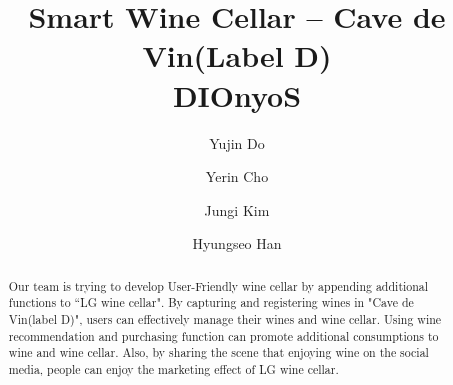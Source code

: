 \documentclass[sigconf, nonacm]{acmart}
\begin{document}
\title{Smart Wine Cellar – Cave de Vin(Label D)\\DIOnyoS}

\author{Yujin Do}

\author{Yerin Cho}

\author{Jungi Kim}

\author{Hyungseo Han}





\begin{abstract}
Our team is trying to develop User-Friendly wine cellar by appending additional functions to “LG wine cellar". By capturing and registering wines in "Cave de Vin(label D)", users can effectively manage their wines and wine cellar. Using wine recommendation and purchasing function can promote additional consumptions to wine and wine cellar. Also, by sharing the scene that enjoying wine on the social media, people can enjoy the marketing effect of LG wine cellar.
\end{abstract}

\maketitle
\end{document}
